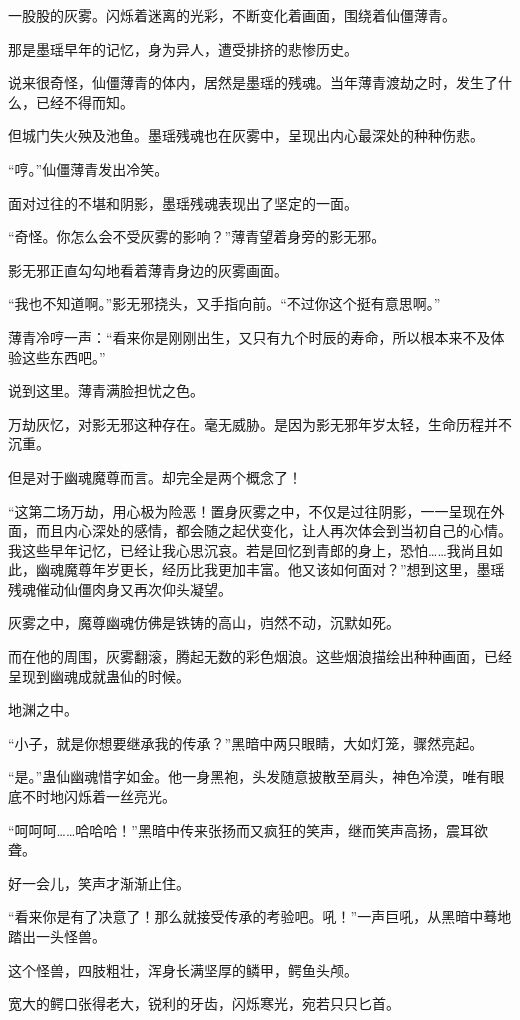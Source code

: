 \begin{this_body}
一股股的灰雾。闪烁着迷离的光彩，不断变化着画面，围绕着仙僵薄青。

那是墨瑶早年的记忆，身为异人，遭受排挤的悲惨历史。

说来很奇怪，仙僵薄青的体内，居然是墨瑶的残魂。当年薄青渡劫之时，发生了什么，已经不得而知。

但城门失火殃及池鱼。墨瑶残魂也在灰雾中，呈现出内心最深处的种种伤悲。

“哼。”仙僵薄青发出冷笑。

面对过往的不堪和阴影，墨瑶残魂表现出了坚定的一面。

“奇怪。你怎么会不受灰雾的影响？”薄青望着身旁的影无邪。

影无邪正直勾勾地看着薄青身边的灰雾画面。

“我也不知道啊。”影无邪挠头，又手指向前。“不过你这个挺有意思啊。”

薄青冷哼一声：“看来你是刚刚出生，又只有九个时辰的寿命，所以根本来不及体验这些东西吧。”

说到这里。薄青满脸担忧之色。

万劫灰忆，对影无邪这种存在。毫无威胁。是因为影无邪年岁太轻，生命历程并不沉重。

但是对于幽魂魔尊而言。却完全是两个概念了！

“这第二场万劫，用心极为险恶！置身灰雾之中，不仅是过往阴影，一一呈现在外面，而且内心深处的感情，都会随之起伏变化，让人再次体会到当初自己的心情。我这些早年记忆，已经让我心思沉哀。若是回忆到青郎的身上，恐怕……我尚且如此，幽魂魔尊年岁更长，经历比我更加丰富。他又该如何面对？”想到这里，墨瑶残魂催动仙僵肉身又再次仰头凝望。

灰雾之中，魔尊幽魂仿佛是铁铸的高山，岿然不动，沉默如死。

而在他的周围，灰雾翻滚，腾起无数的彩色烟浪。这些烟浪描绘出种种画面，已经呈现到幽魂成就蛊仙的时候。

地渊之中。

“小子，就是你想要继承我的传承？”黑暗中两只眼睛，大如灯笼，骤然亮起。

“是。”蛊仙幽魂惜字如金。他一身黑袍，头发随意披散至肩头，神色冷漠，唯有眼底不时地闪烁着一丝亮光。

“呵呵呵……哈哈哈！”黑暗中传来张扬而又疯狂的笑声，继而笑声高扬，震耳欲聋。

好一会儿，笑声才渐渐止住。

“看来你是有了决意了！那么就接受传承的考验吧。吼！”一声巨吼，从黑暗中蓦地踏出一头怪兽。

这个怪兽，四肢粗壮，浑身长满坚厚的鳞甲，鳄鱼头颅。

宽大的鳄口张得老大，锐利的牙齿，闪烁寒光，宛若只只匕首。


\end{this_body}
